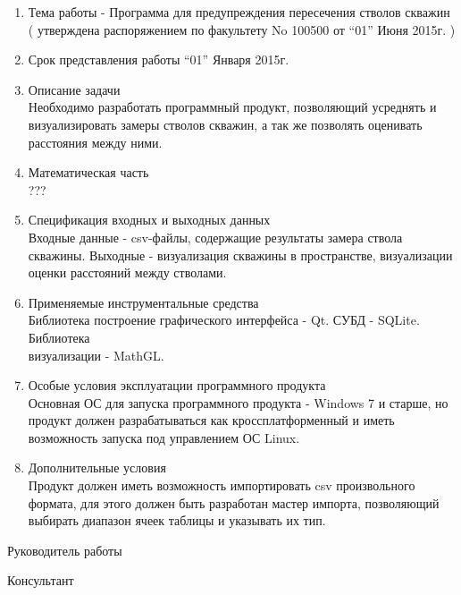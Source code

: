 \begin{titlepage}
\begin{enumerate}
  \item Тема работы - Программа для предупреждения пересечения стволов скважин\\
  ( утверждена распоряжением по факультету No 100500 от “01” Июня 2015г. )
  \item Срок представления работы “01” Января 2015г.
  \item Описание задачи\\
    Необходимо разработать программный продукт, позволяющий усреднять и визуализировать замеры стволов скважин, а так же
    позволять оценивать расстояния между ними.
  \item Математическая часть\\
  ???
  \item Спецификация входных и выходных данных\\
  Входные данные - csv-файлы, содержащие результаты замера ствола скважины. Выходные - визуализация скважины в пространстве, визуализации оценки расстояний
  между стволами.
  \item Применяемые инструментальные средства\\
  Библиотека построение графического интерфейса - Qt. СУБД - SQLite. Библиотека\\визуализации - MathGL.
  \item Особые условия эксплуатации программного продукта\\
  Основная ОС для запуска программного продукта - Windows 7 и старше, но продукт должен разрабатываться как кроссплатформенный и иметь возможность запуска
  под управлением ОС Linux.
  \item Дополнительные условия\\
  Продукт должен иметь возможность импортировать csv произвольного формата, для этого должен быть разработан мастер импорта, позволяющий
  выбирать диапазон ячеек таблицы и указывать их тип.
\end{enumerate}

\vspace{\fill}

Руководитель работы \underline{\hspace{5cm}}

Консультант \underline{\hspace{6.5cm}}
\end{titlepage}
